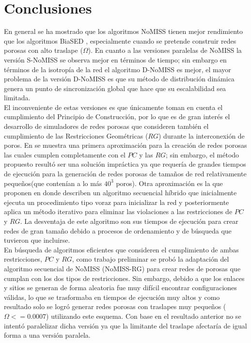 \section{Conclusiones}
\label{sec:rwconclutions}
En general se ha mostrado que los algoritmos NoMISS tienen mejor rendimiento que los algoritmos BiaSED \cite{ref3}, especialmente cuando se pretende construir redes porosas con alto traslape ($\Omega$). En cuanto a las versiones paralelas de NoMISS la versión S-NoMISS se observa mejor  en términos de tiempo; sin embargo en términos de la isotropía de la red el algoritmo D-NoMISS es mejor, el mayor problema de la versión  D-NoMISS es que su método de distribución dinámica genera un punto de sincronización global que hace que su escalabilidad sea limitada.\\

El inconveniente de estas versiones es que únicamente toman en cuenta el cumplimiento del Principio de Construcción, por lo que  es de gran interés el desarrollo de simuladores de redes porosas que consideren también el cumplimiento de las  Restricciones Geométricas ($RG$) durante la interconexión de poros. En \cite{ref5} se muestra una primera aproximación para 
la creación de redes porosas las cuales cumplen  completamente con el $PC$ y las $RG$; sin embargo, el método propuesto resultó ser una solución impráctica ya que requería de grandes tiempos de ejecución para la generación de redes porosas de tamaños de red relativamente pequeños(que contenían a lo más $40^3$ poros). Otra aproximación es la que proponen en \cite{ref17} donde describen un algoritmo secuencial híbrido que inicialmente ejecuta un procedimiento tipo voraz para inicializar la red y posteriormente aplica un método iterativo para eliminar las violaciones a las restricciones de $PC$ y $RG$. La desventaja de este algoritmo son sus tiempos de ejecución para crear redes de gran tamaño debido a procesos de ordenamiento y de búsqueda que tuvieron que incluirse.\\

En búsqueda de algoritmos eficientes que consideren el cumplimiento de ambas restricciones, $PC$ y $RG$, como trabajo preliminar se probó la adaptación del algoritmo secuencial de NoMISS (NoMISS-RG) para crear redes de porosas que cumplan con los dos tipos de restricciones. Sin embargo, debido a que los enlaces y sitios se generan de forma aleatoria fue muy difícil encontrar configuraciones válidas, lo que se trasformaba en tiempos de ejecución muy altos y como resultado solo se logró generar redes porosas con traslapes muy pequeños ($\Omega<=0.0007$) utilizando este esquema. Con base en el resultado anterior no se intentó paralelizar dicha versión ya que la limitante del traslape afectaría de igual forma a una versión paralela.\\

